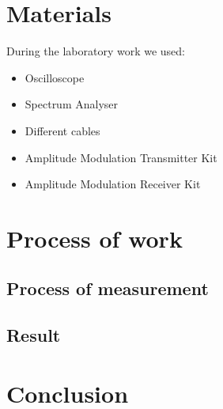 \documentclass[english]{article}
\begin{document}
\section{Materials}
During the laboratory work we used:
\begin{itemize}
\item Oscilloscope
\item Spectrum Analyser  
\item Different cables
\item Amplitude Modulation Transmitter Kit 
\item Amplitude Modulation Receiver Kit 
\end{itemize}
\section{Process of work}
\subsection{Process of measurement}
\subsection{Result}

\section{Conclusion}
\end{document}
